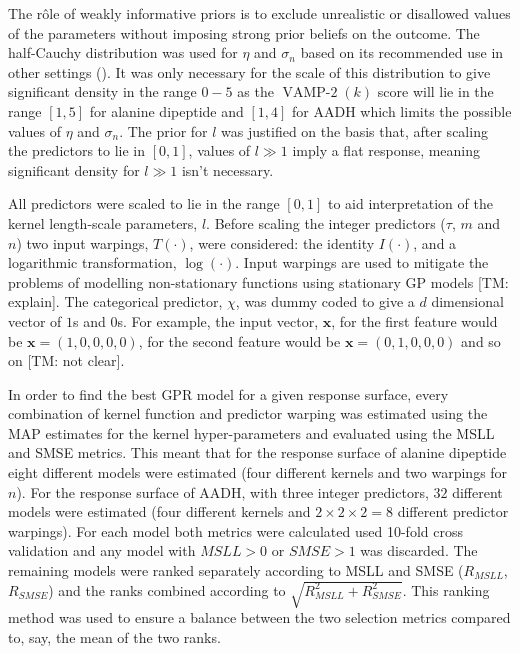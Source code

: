 The r\^ole of weakly informative priors is to exclude unrealistic or disallowed values of the parameters without imposing strong prior beliefs on the outcome. The half-Cauchy distribution  was used for $\eta$ and $\sigma_n$  based on its recommended use in other settings (\cite{polsonHalfCauchyPriorGlobal2012}). It was  only necessary for the scale of this distribution to give significant density in the range $0-5$ as the $\operatorname{VAMP-2}(k)$ score will lie in the range $[1,5]$ for alanine dipeptide and $[1, 4]$ for AADH which limits the possible values of $\eta$ and $\sigma_{n}$. The prior for $l$ was justified on the basis that, after scaling the predictors to lie in $[0, 1]$, values of $l \gg 1$ imply a flat response, meaning significant density for $l \gg 1$ isn't necessary. 

All predictors were scaled to lie in the range $[0, 1]$ to aid interpretation of the kernel length-scale parameters, $l$. Before scaling the integer predictors ($\tau$, $m$ and $n$) two input warpings, $T(\cdot)$, were considered: the identity $I(\cdot)$, and a logarithmic transformation, $\log(\cdot)$.  Input warpings are used \cite{snoekInputWarpingBayesian2014a} to mitigate the problems of modelling non-stationary functions using stationary GP models [TM: explain]. The categorical predictor, $\chi$, was dummy coded \cite{dalyDummyCodingVs2016} to give a $d$ dimensional vector of $1$s and $0$s. For example, the input vector, $\mathbf{x}$, for the first feature would be $\mathbf{x} = (1, 0, 0, 0, 0)$, for the second feature would be $\mathbf{x} = (0, 1, 0, 0, 0)$ and so on [TM: not clear]. 

In order to find the best GPR model for a given response surface, every combination of kernel function and  predictor warping was estimated using the MAP estimates for the kernel hyper-parameters and evaluated using the MSLL and SMSE metrics. This meant that for the response surface of alanine dipeptide eight different models were estimated (four different kernels and two warpings for $n$). For the response surface of AADH, with three integer predictors, $32$ different models were estimated (four different kernels and $2\times2\times2=8$ different predictor warpings). For each model both metrics were calculated used 10-fold cross validation and any model with $MSLL > 0$ or $SMSE > 1$ was discarded. The remaining models were ranked separately according to MSLL and SMSE ($R_{MSLL}$, $R_{SMSE}$) and the ranks combined according to $\sqrt{R_{MSLL}^2 + R_{SMSE}^2}$. This ranking method was used to ensure a balance between the two selection metrics compared to, say, the mean of the two ranks.  

